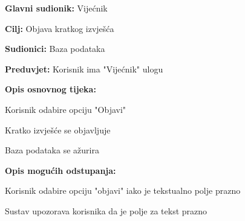 					\begin{packed_item}
	
						\item \textbf{Glavni sudionik: }Vijećnik
						\item  \textbf{Cilj:} Objava kratkog izvješća
						\item  \textbf{Sudionici:} Baza podataka
						\item  \textbf{Preduvjet:} Korisnik ima "Vijećnik" ulogu
						\item  \textbf{Opis osnovnog tijeka:}
						
						\item[] \begin{packed_enum}
	
							\item Korisnik odabire opciju "Objavi" 
							\item Kratko izvješće se objavljuje
							\item Baza podataka se ažurira
							
							
							
							
							
						\end{packed_enum}
						\item  \textbf{Opis mogućih odstupanja:}
						
						\item[] \begin{packed_item}
						\item[2.a] Korisnik odabire opciju "objavi" iako je tekstualno polje prazno
							\item[] \begin{packed_enum}
								
								\item Sustav upozorava korisnika da je polje za tekst prazno
								
							\end{packed_enum}
						\end{packed_item}
						
						
						
					\end{packed_item}
					\noindent {}
